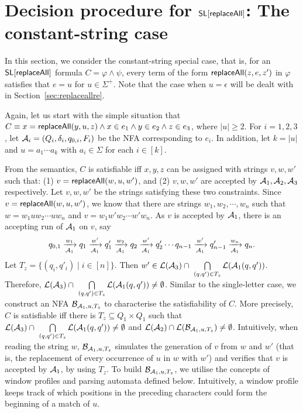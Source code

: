 
\section{Decision procedure for $\mathsf{SL}[\mathsf{replaceAll}]$: The constant-string case}\label{sec:replaceallcs}

In this section, we consider the constant-string special case, that is, for an $\mathsf{SL}[\mathsf{replaceAll}]$ formula $C = \varphi \wedge \psi$, every term of the form $\mathsf{replaceAll}(z, e, z')$ in $\varphi$ satisfies that $e=u$ for $u \in \Sigma^+$. Note that the case when $u=\epsilon$ will be dealt with in Section~\ref{sec:replaceallre}.

Again, let us start with the simple situation that
$C \equiv x = \mathsf{replaceAll}(y, u, z) \wedge x \in e_1 \wedge y \in e_2 \wedge z \in e_3$,
where $|u| \ge 2$. For $i=1,2,3$, let $\mathcal{A}_i = (Q_i, \delta_i, q_{0, i}, F_i)$
be the NFA corresponding to $e_i$. In addition, let $k = |u|$ and $u = a_1 \cdots a_k$ with $a_i \in \Sigma$ for each $i \in [k]$.

From the semantics, $C$ is satisfiable iff $x, y, z$ can be assigned with  strings $v, w, w'$ such that: (1) $v = \mathsf{replaceAll}(w, u, w')$, and (2) $v,w, w'$ are accepted by $\mathcal{A}_1, \mathcal{A}_2, \mathcal{A}_3$ respectively. Let $v, w, w'$ be the strings satisfying these two constraints. Since $v = \mathsf{replaceAll}(w, u, w')$, we know that there are strings $w_1, w_2, \cdots, w_n$ such that $w= w_1 u w_2 \cdots u w_n$ and $v = w_1 w' w_2 \cdots w' w_n$. As $v$ is accepted by $\mathcal{A}_1$, there is an accepting run of $\mathcal{A}_1$ on $v$, say
$$
q_{0,1} \xrightarrow[\mathcal{A}_1]{w_1} q_1 \xrightarrow[\mathcal{A}_1]{w'} q'_1 \xrightarrow[\mathcal{A}_1]{w_2} q_2 \xrightarrow[\mathcal{A}_1]{w'} q'_2 \cdots q_{n-1} \xrightarrow[\mathcal{A}_1]{w'} q'_{n-1} \xrightarrow[\mathcal{A}_1]{w_n} q_n.
$$
Let $T_z = \{(q_i, q'_i) \mid i \in [n]\}$. Then $w' \in \mathcal{L}(\mathcal{A}_3) \cap\ \bigcap \limits_{(q,q') \in T_z} \mathcal{L}(\mathcal{A}_1(q, q'))$. Therefore, $\mathcal{L}(\mathcal{A}_3) \cap\ \bigcap \limits_{(q,q') \in T_z} \mathcal{L}(\mathcal{A}_1(q, q')) \neq \emptyset$. Similar to the single-letter case, we construct an NFA $\mathcal{B}_{\mathcal{A}_1, u, T_z}$ to characterise the satisfiability of $C$.  More precisely, $C$ is satisfiable iff there is $T_z \subseteq Q_1 \times Q_1$ such that $\mathcal{L}(\mathcal{A}_3) \cap\ \bigcap \limits_{(q,q') \in T_z} \mathcal{L}(\mathcal{A}_1(q, q')) \neq \emptyset$ and
$\mathcal{L}(\mathcal{A}_2) \cap \mathcal{L}(\mathcal{B}_{\mathcal{A}_1, u, T_z}) \neq \emptyset$. Intuitively, when reading the string $w$, $\mathcal{B}_{\mathcal{A}_1, u, T_z}$ simulates the generation of $v$ from $w$ and $w'$ (that is, the replacement of  every occurrence of $u$ in $w$ with $w'$) and verifies that $v$ is accepted by $\mathcal{A}_1$, by using $T_z$.
To build $\mathcal{B}_{\mathcal{A}_1, u, T_z}$, we utilise the concepts of window profiles and parsing automata defined below.
Intuitively, a window profile keeps track of which positions in the preceding characters could form the beginning of a match of $u$.
%



